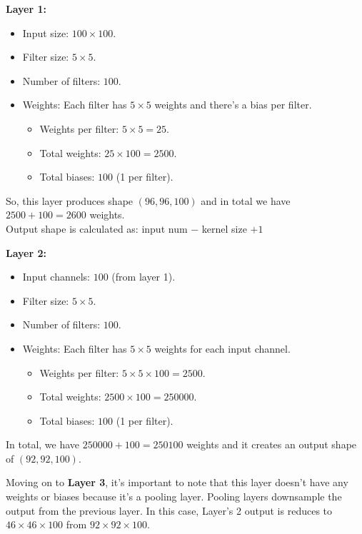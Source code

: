 \begin{minipage}[l]{0.47\textwidth}
	\textbf{Layer 1:}
	\begin{itemize}
		\item Input size: $100 \times 100$.
		\item Filter size: $5 \times 5$.
		\item Number of filters: $100$.
		\item Weights: Each filter has $5 \times 5$ weights and there's a bias per filter.
		\begin{itemize}
			\item Weights per filter: $5 \times 5=25$.
			\item Total weights: $25\times 100=2500$.
			\item Total biases: $100$ (1 per filter).
		\end{itemize}
	\end{itemize}
	So, this layer produces shape $\left(96,96,100\right)$ and in total we have $2500 + 100 = 2600$ weights. \\ {\small Output shape is calculated as: input num $ - $ kernel size $+ 1$}
\end{minipage}
\hfil
\begin{minipage}[r]{0.47\textwidth}
	\textbf{Layer 2:}
	\begin{itemize}
		\item Input channels: $100$ (from layer 1).
		\item Filter size: $5 \times 5$.
		\item Number of filters: $100$.
		\item Weights: Each filter has $5 \times 5$ weights for each input channel.
		\begin{itemize}
			\item Weights per filter: $5 \times 5 \times 100 = 2500$.
			\item Total weights: $2500\times 100 = \num{250000}$.
			\item Total biases: $100$ (1 per filter).
		\end{itemize}
	\end{itemize}
	In total, we have $\num{250000} + 100 = \num{250100}$ weights and it creates an output shape of $\left(92,92,100\right)$.
\end{minipage}

\vspace{3mm}

Moving on to \textbf{Layer 3}, it's important to note that this layer doesn't have any weights or biases because it's a pooling layer. Pooling layers downsample the output from the previous layer.
In this case, Layer's 2 output is reduces to $46 \times 46 \times 100$  from $92 \times 92 \times 100$.\\

